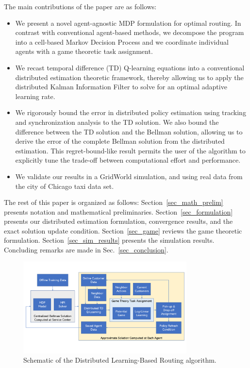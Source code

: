 \documentclass[journal]{IEEEtran}
\begin{document}
The main contributions of the paper are as follows: 
\begin{itemize}
    \item We present a novel agent-agnostic MDP formulation for optimal routing. In contrast with conventional agent-based methods, we decompose the program into a cell-based Markov Decision Process and we coordinate individual agents with a game theoretic task assignment. 
    \item We recast temporal difference (TD) Q-learning equations into a conventional distributed estimation theoretic framework, thereby allowing us to apply the distributed Kalman Information Filter to solve for an optimal adaptive learning rate. 
    \item We rigorously bound the error in distributed policy estimation using tracking and synchronization analysis to the TD solution. We also bound the difference between the TD solution and the Bellman solution, allowing us to derive the error of the complete Bellman solution from the distributed estimation. This regret-bound-like result permits the user of the algorithm to explicitly tune the trade-off between computational effort and performance. 
    \item We validate our results in a GridWorld simulation, and using real data from the city of Chicago taxi data set. 
\end{itemize}

The rest of this paper is organized as follows: Section~\ref{sec_math_prelim} presents notation and mathematical preliminaries. Section~\ref{sec_formulation} presents our distributed estimation formulation, convergence results, and the exact solution update condition. Section~\ref{sec_game} reviews the game theoretic formulation. Section~\ref{sec_sim_results} presents the simulation results. Concluding remarks are made in Sec.~\ref{sec_conclusion}. 
\begin{figure}
    \centering
    \includegraphics[width=3.5in]{overview_graphic_v3.pdf}
    \caption{Schematic of the Distributed Learning-Based Routing algorithm.}
    \label{overview_algorithm}
\end{figure}
\end{document}
